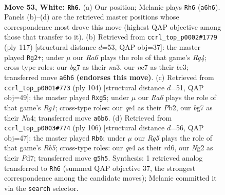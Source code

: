 \documentclass[11pt]{article}
\begin{document}
\clearpage

\begin{figure}[p]\centering
\begin{subfigure}{0.46\textwidth}\centering
\resizebox{\linewidth}{!}{%
\newchessgame
\chessboard[
  setfen={6k1/1rn2pb1/R7/3P2R1/4q3/8/5KN1/8 w - - 2 53},
  showmover=false,
  pgfstyle=straightmove, color=movearrow, markmove={a6-h6}
]}
\caption{}
\end{subfigure}\hfill
\begin{subfigure}{0.46\textwidth}\centering
\resizebox{\linewidth}{!}{%
\newchessgame
\chessboard[
  setfen={8/7k/8/1p4r1/1P6/N2RB3/K7/2r5 b - - 20 59},
  showmover=false,
  pgfstyle=straightmove, color=movearrow, markmove={g5-g2}
]}
\caption{}
\end{subfigure}
\\[4pt]
\begin{subfigure}{0.46\textwidth}\centering
\resizebox{\linewidth}{!}{%
\newchessgame
\chessboard[
  setfen={7k/7p/8/r5b1/N2Rp3/5n2/KPP5/6R1 w - - 3 53},
  showmover=false,
  pgfstyle=straightmove, color=movearrow, markmove={g1-g5}
]}
\caption{}
\end{subfigure}\hfill
\begin{subfigure}{0.46\textwidth}\centering
\resizebox{\linewidth}{!}{%
\newchessgame
\chessboard[
  setfen={8/R2P2p1/3r4/1R1bk1n1/8/8/5KP1/8 w - - 0 54},
  showmover=false,
  pgfstyle=straightmove, color=movearrow, markmove={b5-b6}
]}
\caption{}
\end{subfigure}
\caption{\textbf{Move 53, White: \texttt{Rh6}.} (a) Our position; Melanie plays \texttt{Rh6} (\texttt{a6h6}). Panels (b)--(d) are the retrieved master positions whose correspondence most drove this move (highest QAP objective among those that transfer to it). (b) Retrieved from \texttt{ccrl\_top\_p0002\#1779} (ply 117) [structural distance $d$=53, QAP obj=37]: the master played \texttt{Rg2+}; under $\mu$ our \emph{Ra6} plays the role of that game's \emph{Rg4}; cross-type roles: our \emph{b}g7 as their \emph{n}a3, our \emph{n}c7 as their \emph{b}e3; transferred move \texttt{a6h6} \textbf{(endorses this move)}. (c) Retrieved from \texttt{ccrl\_top\_p0001\#773} (ply 104) [structural distance $d$=51, QAP obj=49]: the master played \texttt{Rxg5}; under $\mu$ our \emph{Ra6} plays the role of that game's \emph{Rg1}; cross-type roles: our \emph{q}e4 as their \emph{P}b2, our \emph{b}g7 as their \emph{N}a4; transferred move \texttt{a6b6}. (d) Retrieved from \texttt{ccrl\_top\_p0003\#774} (ply 106) [structural distance $d$=56, QAP obj=47]: the master played \texttt{Rb6}; under $\mu$ our \emph{Rg5} plays the role of that game's \emph{Rb5}; cross-type roles: our \emph{q}e4 as their \emph{r}d6, our \emph{N}g2 as their \emph{P}d7; transferred move \texttt{g5h5}. Synthesis: 1 retrieved analog transferred to \texttt{Rh6} (summed QAP objective 37, the strongest correspondence among the candidate moves); Melanie committed it via the \texttt{search} selector.}
\label{fig:thought-m104}
\end{figure}
\end{document}
